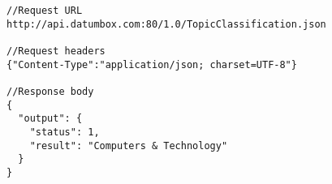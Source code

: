 \lstset{language=Java, caption=DatumBox Topic Classification example, label=DBTopicClassificationExample}
\begin{lstlisting}
//Request URL
http://api.datumbox.com:80/1.0/TopicClassification.json

//Request headers
{"Content-Type":"application/json; charset=UTF-8"}

//Response body
{
  "output": {
    "status": 1,
    "result": "Computers & Technology"
  }
}
\end{lstlisting}